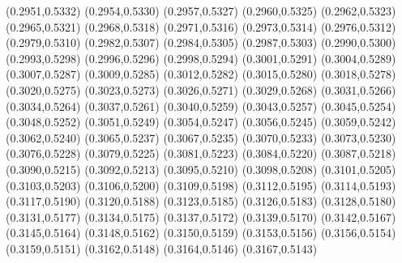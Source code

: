 \PST@Filltriangle(0.2951,0.5332)
\PST@Filltriangle(0.2954,0.5330)
\PST@Filltriangle(0.2957,0.5327)
\PST@Filltriangle(0.2960,0.5325)
\PST@Filltriangle(0.2962,0.5323)
\PST@Filltriangle(0.2965,0.5321)
\PST@Filltriangle(0.2968,0.5318)
\PST@Filltriangle(0.2971,0.5316)
\PST@Filltriangle(0.2973,0.5314)
\PST@Filltriangle(0.2976,0.5312)
\PST@Filltriangle(0.2979,0.5310)
\PST@Filltriangle(0.2982,0.5307)
\PST@Filltriangle(0.2984,0.5305)
\PST@Filltriangle(0.2987,0.5303)
\PST@Filltriangle(0.2990,0.5300)
\PST@Filltriangle(0.2993,0.5298)
\PST@Filltriangle(0.2996,0.5296)
\PST@Filltriangle(0.2998,0.5294)
\PST@Filltriangle(0.3001,0.5291)
\PST@Filltriangle(0.3004,0.5289)
\PST@Filltriangle(0.3007,0.5287)
\PST@Filltriangle(0.3009,0.5285)
\PST@Filltriangle(0.3012,0.5282)
\PST@Filltriangle(0.3015,0.5280)
\PST@Filltriangle(0.3018,0.5278)
\PST@Filltriangle(0.3020,0.5275)
\PST@Filltriangle(0.3023,0.5273)
\PST@Filltriangle(0.3026,0.5271)
\PST@Filltriangle(0.3029,0.5268)
\PST@Filltriangle(0.3031,0.5266)
\PST@Filltriangle(0.3034,0.5264)
\PST@Filltriangle(0.3037,0.5261)
\PST@Filltriangle(0.3040,0.5259)
\PST@Filltriangle(0.3043,0.5257)
\PST@Filltriangle(0.3045,0.5254)
\PST@Filltriangle(0.3048,0.5252)
\PST@Filltriangle(0.3051,0.5249)
\PST@Filltriangle(0.3054,0.5247)
\PST@Filltriangle(0.3056,0.5245)
\PST@Filltriangle(0.3059,0.5242)
\PST@Filltriangle(0.3062,0.5240)
\PST@Filltriangle(0.3065,0.5237)
\PST@Filltriangle(0.3067,0.5235)
\PST@Filltriangle(0.3070,0.5233)
\PST@Filltriangle(0.3073,0.5230)
\PST@Filltriangle(0.3076,0.5228)
\PST@Filltriangle(0.3079,0.5225)
\PST@Filltriangle(0.3081,0.5223)
\PST@Filltriangle(0.3084,0.5220)
\PST@Filltriangle(0.3087,0.5218)
\PST@Filltriangle(0.3090,0.5215)
\PST@Filltriangle(0.3092,0.5213)
\PST@Filltriangle(0.3095,0.5210)
\PST@Filltriangle(0.3098,0.5208)
\PST@Filltriangle(0.3101,0.5205)
\PST@Filltriangle(0.3103,0.5203)
\PST@Filltriangle(0.3106,0.5200)
\PST@Filltriangle(0.3109,0.5198)
\PST@Filltriangle(0.3112,0.5195)
\PST@Filltriangle(0.3114,0.5193)
\PST@Filltriangle(0.3117,0.5190)
\PST@Filltriangle(0.3120,0.5188)
\PST@Filltriangle(0.3123,0.5185)
\PST@Filltriangle(0.3126,0.5183)
\PST@Filltriangle(0.3128,0.5180)
\PST@Filltriangle(0.3131,0.5177)
\PST@Filltriangle(0.3134,0.5175)
\PST@Filltriangle(0.3137,0.5172)
\PST@Filltriangle(0.3139,0.5170)
\PST@Filltriangle(0.3142,0.5167)
\PST@Filltriangle(0.3145,0.5164)
\PST@Filltriangle(0.3148,0.5162)
\PST@Filltriangle(0.3150,0.5159)
\PST@Filltriangle(0.3153,0.5156)
\PST@Filltriangle(0.3156,0.5154)
\PST@Filltriangle(0.3159,0.5151)
\PST@Filltriangle(0.3162,0.5148)
\PST@Filltriangle(0.3164,0.5146)
\PST@Filltriangle(0.3167,0.5143)
